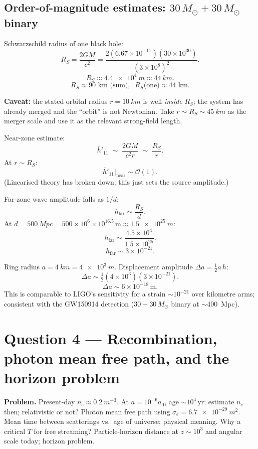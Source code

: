 \documentclass[11pt]{article}
\begin{document}
\subsection*{Order-of-magnitude estimates: $30\,M_{\odot}+30\,M_{\odot}$ binary}

Schwarzschild radius of one black hole:
\[ R_{S} = \frac{2GM}{c^{2}} = \frac{2(6.67\times 10^{-11})(30\times 10^{30})}{(3\times 10^{8})^{2}}. \]
\[ R_{S}\approx \SI{4.4e4}{m}\approx \SI{44}{km}. \]
\[ \boxed{\;R_{S}\approx 90\text{ km (sum)},\;\;R_{S}\text{(one)}\approx 44\text{ km}.\;} \]

\textbf{Caveat:} the stated orbital radius $r=\SI{10}{km}$ is well \emph{inside} $R_{S}$; the system has already merged and the ``orbit'' is not Newtonian. Take $r\sim R_{S}\sim\SI{45}{km}$ as the merger scale and use it as the relevant strong-field length.

Near-zone estimate:
\[ \bar h'_{11}\;\sim\;\frac{2GM}{c^{2}r}\;\sim\;\frac{R_{S}}{r}. \]
At $r\sim R_{S}$:
\[ \boxed{\;\bar h'_{11}\big|_{\text{near}}\sim \mathcal O(1).\;} \]
(Linearised theory has broken down; this just sets the source amplitude.)

Far-zone wave amplitude falls as $1/d$:
\[ h_{\text{far}} \sim \frac{R_{S}}{d}. \]
At $d=\SI{500}{Mpc}=500\times 10^{6}\times 10^{16.5}\,\text{m}\approx \SI{1.5e25}{m}$:
\[ h_{\text{far}} \sim \frac{4.5\times 10^{4}}{1.5\times 10^{25}}. \]
\[ \boxed{\;h_{\text{far}}\sim 3\times 10^{-21}.\;} \]

Ring radius $a=\SI{4}{km}=\SI{4e3}{m}$. Displacement amplitude $\Delta a=\tfrac12 a\,h$:
\[ \Delta a \sim \tfrac12(4\times 10^{3})(3\times 10^{-21}). \]
\[ \boxed{\;\Delta a\sim 6\times 10^{-18}\,\text{m}.\;} \]
This is comparable to LIGO's sensitivity for a strain $\sim 10^{-21}$ over kilometre arms; consistent with the GW150914 detection ($30+30\,M_{\odot}$ binary at $\sim$\SI{400}{Mpc}).

\section*{Question 4 --- Recombination, photon mean free path, and the horizon problem}

\textbf{Problem.} Present-day $n_{e}\approx \SI{0.2}{m^{-3}}$. At $a=10^{-6}a_{0}$, age $\sim 10^{4}\,\text{yr}$: estimate $n_{e}$ then; relativistic or not? Photon mean free path using $\sigma_{e}=\SI{6.7e-29}{m^{2}}$. Mean time between scatterings vs.\ age of universe; physical meaning. Why a critical $T$ for free streaming? Particle-horizon distance at $z\sim 10^{3}$ and angular scale today; horizon problem.
\end{document}
